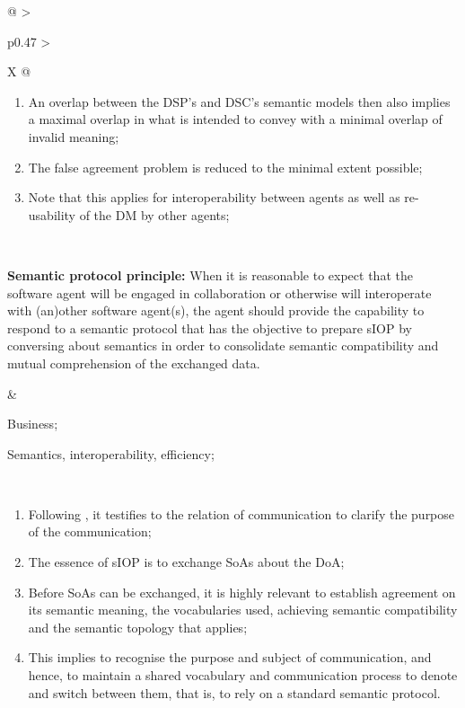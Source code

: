 \begin{xltabular}[l]{\linewidth}{@{} >{\small\raggedright\arraybackslash}p{0.47\linewidth} >{\small\raggedright\arraybackslash}X @{}}
\begin{enumerate}[left=10pt, nosep]
\begin{enumerate}
    \item the DSC allows minimal room to interpret the exchanged SoA invalidly;
  \end{enumerate}
  \item An overlap between the DSP's and DSC's semantic models then also implies a maximal overlap in what is intended to convey with a minimal overlap of invalid meaning; 
  \item The false agreement problem is reduced to the minimal extent possible;
  \item Note that this applies for interoperability between agents as well as re-usability of the DM by other agents;
\end{enumerate} \\
%
%
%
\begin{mmdp}\label{dp:spp}{\bfseries Semantic protocol principle:}
\quad When it is reasonable to expect that the software agent will be engaged in collaboration or otherwise will interoperate with (an)other software agent(s), the agent should provide the capability to respond to a semantic protocol that has the objective to prepare sIOP by conversing about semantics in order to consolidate semantic compatibility and mutual comprehension of the exchanged data.
\end{mmdp}
&
\begin{description}[labelwidth=3.7cm,leftmargin=3.7cm+1ex,nosep,topsep=2ex,labelsep=1ex,font=\bfseries]
  \item[Type of information:] Business;
  \item[Quality attributes:] Semantics, interoperability, efficiency;
\end{description} \\
\begin{enumerate}[left=6pt, nosep]
  \item Following \cite{Grice:1991BT}, it testifies to the relation of communication to clarify the purpose of the communication;
  \item The essence of sIOP is to exchange SoAs about the DoA;
  \item Before SoAs can be exchanged, it is highly relevant to establish agreement on its semantic meaning, the vocabularies used, achieving semantic compatibility and the semantic topology that applies;
  \item This implies to recognise the purpose and subject of communication, and hence, to maintain a shared vocabulary and communication process to denote and switch between them, that is, to rely on a standard semantic protocol.

\end{enumerate}
\end{xltabular}
